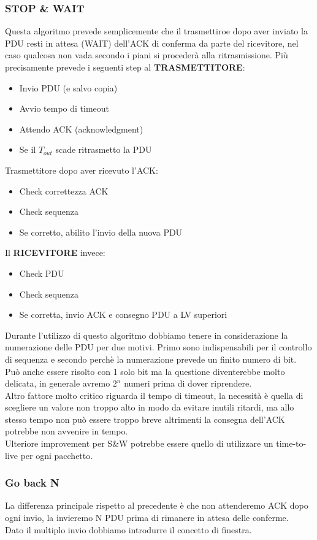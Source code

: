 \documentclass[12pt]{article}
\begin{document}
\subsubsection{STOP \& WAIT}
Questa algoritmo prevede semplicemente che il trasmettiroe dopo aver inviato la PDU resti in attesa (WAIT) dell'ACK di conferma da parte del ricevitore, nel caso qualcosa non vada secondo i piani si procederà alla ritrasmissione. Più precisamente prevede i seguenti step al \textbf{TRASMETTITORE}:
\begin{itemize}
  \item Invio PDU (e salvo copia)
  \item Avvio tempo di timeout
  \item Attendo ACK (acknowledgment)
  \item Se il $T_{out}$ scade ritrasmetto la PDU
\end{itemize}
Trasmettitore dopo aver ricevuto l'ACK:
\begin{itemize}
  \item Check correttezza ACK
  \item Check sequenza
  \item Se corretto, abilito l'invio della nuova PDU
\end{itemize}
Il \textbf{RICEVITORE} invece:
\begin{itemize}
  \item Check PDU
  \item Check sequenza
  \item Se corretta, invio ACK e consegno PDU a LV superiori
\end{itemize}
Durante l'utilizzo di questo algoritmo dobbiamo tenere in considerazione la numerazione delle PDU per due motivi. Primo sono indispensabili per il controllo di sequenza e secondo perchè la numerazione prevede un finito numero di bit. Può anche essere risolto con 1 solo bit ma la questione diventerebbe molto delicata, in generale avremo $2^n$ numeri prima di dover riprendere.\\
Altro fattore molto critico riguarda il tempo di timeout, la necessità è quella di scegliere un valore non troppo alto in modo da evitare inutili ritardi, ma allo stesso tempo non può essere troppo breve altrimenti la consegna dell'ACK potrebbe non avvenire in tempo.\\
Ulteriore improvement per S\&W potrebbe essere quello di utilizzare un time-to-live per ogni pacchetto.

\subsubsection{Go back N}
La differenza principale rispetto al precedente è che non attenderemo ACK dopo ogni invio, la invieremo N PDU prima di rimanere in attesa delle conferme.\\
Dato il multiplo invio dobbiamo introdurre il concetto di finestra.
\end{document}
